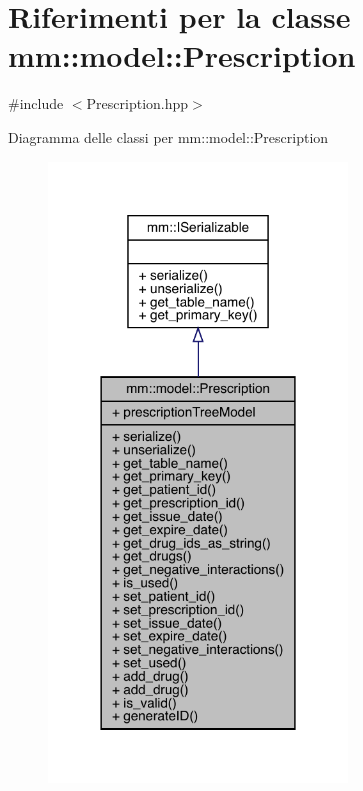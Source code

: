\hypertarget{classmm_1_1model_1_1_prescription}{}\section{Riferimenti per la classe mm\+:\+:model\+:\+:Prescription}
\label{classmm_1_1model_1_1_prescription}


{\ttfamily \#include $<$Prescription.\+hpp$>$}



Diagramma delle classi per mm\+:\+:model\+:\+:Prescription
\nopagebreak
\begin{figure}[H]
\begin{center}
\leavevmode
\includegraphics[width=225pt]{da/d21/classmm_1_1model_1_1_prescription__inherit__graph}
\end{center}
\end{figure}


